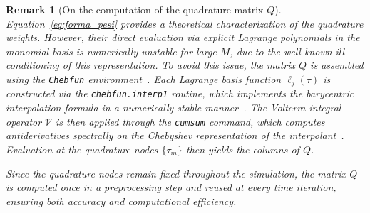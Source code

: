 \documentclass[a4paper,num-refs]{oup-contemporary-spidec}
\newtheorem{remark}[theorem]{Remark}
\begin{document}
\begin{remark}[On the computation of the quadrature matrix $Q$]
Equation~\eqref{eq:forma_pesi} provides a theoretical characterization of the quadrature weights. However, their direct evaluation via explicit Lagrange polynomials in the monomial basis is numerically unstable for large $M$, due to the well-known ill-conditioning of this representation. To avoid this issue, the matrix $Q$ is assembled using the \texttt{Chebfun} environment~\cite{Driscoll2014ChebfunGuide}. Each Lagrange basis function $\ell_j(\tau)$ is constructed via the \texttt{chebfun.interp1} routine, which implements the barycentric interpolation formula in a numerically stable manner~\cite{BerrutTrefethen2004}. The Volterra integral operator $\mathcal{V}$ is then applied through the \texttt{cumsum} command, which computes antiderivatives spectrally on the Chebyshev representation of the interpolant~\cite{AurentzTrefethen2017}. Evaluation at the quadrature nodes $\{\tau_m\}$ then yields the columns of $Q$.

Since the quadrature nodes remain fixed throughout the simulation, the matrix $Q$ is computed once in a preprocessing step and reused at every time iteration, ensuring both accuracy and computational efficiency.
\end{remark}
\end{document}

